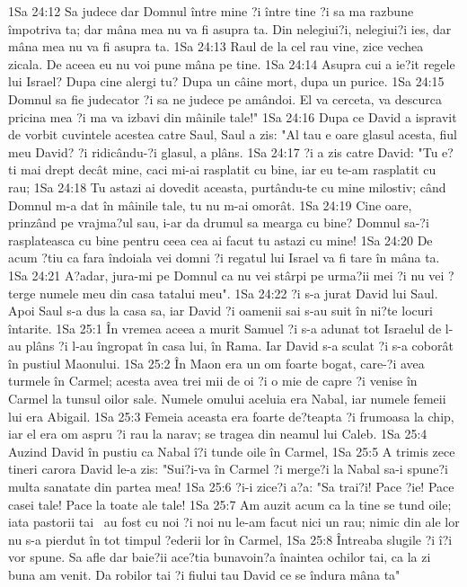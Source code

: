 1Sa 24:12  Sa judece dar Domnul între mine ?i între tine ?i sa ma razbune împotriva ta; dar mâna mea nu va fi asupra ta. Din nelegiui?i, nelegiui?i ies, dar mâna mea nu va fi asupra ta.
1Sa 24:13  Raul de la cel rau vine, zice vechea zicala. De aceea eu nu voi pune mâna pe tine.
1Sa 24:14  Asupra cui a ie?it regele lui Israel? Dupa cine alergi tu? Dupa un câine mort, dupa un purice.
1Sa 24:15  Domnul sa fie judecator ?i sa ne judece pe amândoi. El va cerceta, va descurca pricina mea ?i ma va izbavi din mâinile tale!"
1Sa 24:16  Dupa ce David a ispravit de vorbit cuvintele acestea catre Saul, Saul a zis: "Al tau e oare glasul acesta, fiul meu David? ?i ridicându-?i glasul, a plâns.
1Sa 24:17  ?i a zis catre David: "Tu e?ti mai drept decât mine, caci mi-ai rasplatit cu bine, iar eu te-am rasplatit cu rau;
1Sa 24:18  Tu astazi ai dovedit aceasta, purtându-te cu mine milostiv; când Domnul m-a dat în mâinile tale, tu nu m-ai omorât.
1Sa 24:19  Cine oare, prinzând pe vrajma?ul sau, i-ar da drumul sa mearga cu bine? Domnul sa-?i rasplateasca cu bine pentru ceea cea ai facut tu astazi cu mine!
1Sa 24:20  De acum ?tiu ca fara îndoiala vei domni ?i regatul lui Israel va fi tare în mâna ta.
1Sa 24:21  A?adar, jura-mi pe Domnul ca nu vei stârpi pe urma?ii mei ?i nu vei ?terge numele meu din casa tatalui meu".
1Sa 24:22  ?i s-a jurat David lui Saul. Apoi Saul s-a dus la casa sa, iar David ?i oamenii sai s-au suit în ni?te locuri întarite.
1Sa 25:1  În vremea aceea a murit Samuel ?i s-a adunat tot Israelul de l-au plâns ?i l-au îngropat în casa lui, în Rama. Iar David s-a sculat ?i s-a coborât în pustiul Maonului.
1Sa 25:2  În Maon era un om foarte bogat, care-?i avea turmele în Carmel; acesta avea trei mii de oi ?i o mie de capre ?i venise în Carmel la tunsul oilor sale. Numele omului aceluia era Nabal, iar numele femeii lui era Abigail.
1Sa 25:3  Femeia aceasta era foarte de?teapta ?i frumoasa la chip, iar el era om aspru ?i rau la narav; se tragea din neamul lui Caleb.
1Sa 25:4  Auzind David în pustiu ca Nabal î?i tunde oile în Carmel,
1Sa 25:5  A trimis zece tineri carora David le-a zis: "Sui?i-va în Carmel ?i merge?i la Nabal sa-i spune?i multa sanatate din partea mea!
1Sa 25:6  ?i-i zice?i a?a: "Sa trai?i! Pace ?ie! Pace casei tale! Pace la toate ale tale!
1Sa 25:7  Am auzit acum ca la tine se tund oile; iata pastorii tai  au fost cu noi ?i noi nu le-am facut nici un rau; nimic din ale lor nu s-a pierdut în tot timpul ?ederii lor în Carmel,
1Sa 25:8  Întreaba slugile ?i î?i vor spune. Sa afle dar baie?ii ace?tia bunavoin?a înaintea ochilor tai, ca la zi buna am venit. Da robilor tai ?i fiului tau David ce se îndura mâna ta"
